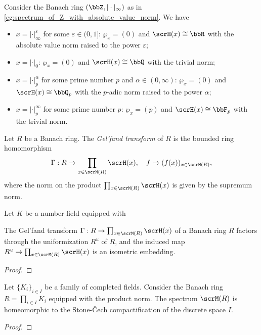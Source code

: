 \begin{example}\label{eg:completed_residue_field_of_Z}
	Consider the Banach ring \((\bbZ, |\cdot|_\infty)\) as in \cref{eg:spectrum_of_Z_with_absolute_value_norm}.
	We have
	\begin{itemize}
		\item \(x = |\cdot|_\infty^\varepsilon\) for some \(\varepsilon \in (0,1]\): \(\wp_x = (0)\) and \(\scrH(x) \cong \bbR\) with the absolute value norm raised to the power \(\varepsilon\);
		\item \(x = |\cdot|_0\): \(\wp_x = (0)\) and \(\scrH(x) \cong \bbQ\) with the trivial norm;
		\item \(x = |\cdot|_p^\alpha\) for some prime number \(p\) and \(\alpha \in (0,\infty)\): \(\wp_x = (0)\) and \(\scrH(x) \cong \bbQ_p\) with the \(p\)-adic norm raised to the power \(\alpha\);
		\item \(x = |\cdot|_p^\infty\) for some prime number \(p\): \(\wp_x = (p)\) and \(\scrH(x) \cong \bbF_p\) with the trivial norm.
	\end{itemize}
\end{example}

\begin{definition}\label{def:Gelfand_transform_of_banach_rings}
	Let \(R\) be a Banach ring.
	The \emph{Gel'fand transform} of \(R\) is the bounded ring homomorphism
	\[
		\Gamma: R \to \prod_{x \in \scrM(R)} \scrH(x), \quad f \mapsto (f(x))_{x \in \scrM(R)},
	\]
	where the norm on the product \(\prod_{x \in \scrM(R)} \scrH(x)\) is given by the supremum norm.
\end{definition}

\begin{example}\label{eg:Gelfand_transform_of_subring_of_matrix_rings}
	Let \(K\) be a number field equipped with 
\end{example}

\begin{proposition}\label{prop:Gelfand_transform_and_the_uniformization_of_a_banach_ring}
	The Gel'fand transform \(\Gamma: R \to \prod_{x \in \scrM(R)} \scrH(x)\) of a Banach ring \(R\) factors through the uniformization \(R^u\) of \(R\),
	and the induced map \(R^u \to \prod_{x \in \scrM(R)} \scrH(x)\) is an isometric embedding.
\end{proposition}
\begin{proof}
\end{proof}

\begin{lemma}\label{lem:spectrum_of_product_of_completed_fields}
	Let \(\{K_i\}_{i \in I}\) be a family of completed fields.
	Consider the Banach ring \(R = \prod_{i \in I} K_i\) equipped with the product norm.
	The spectrum \(\scrM(R)\) is homeomorphic to the Stone-\v{C}ech compactification of the discrete space \(I\).
\end{lemma}
\begin{proof}
\end{proof}

